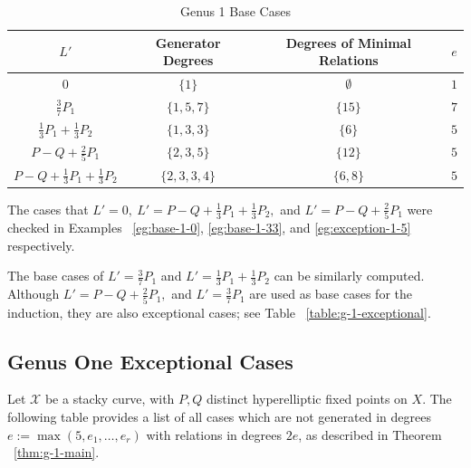 \documentclass{amsart}
\theoremstyle{plain}
\theoremstyle{definition}
\theoremstyle{remark}
\numberwithin{equation}{section}
\newcommand\ssec{\subsection}
\newcommand\sx{\mathscr X}
\newcommand{\halfcan}{L}
\begin{document}
\begin{table}	
\begin{tabular}
{| c || c | c | c |}	
	\hline
	$\halfcan'$ & Generator Degrees & Degrees of Minimal Relations & $e$ \\
	\hline
	\hline
	$0$ & $\{1\}$ & $\emptyset$ & $1$ \\	\hline

	$\frac{3}{7} P_1$ & $\{1,5,7\}$ & $\{15\}$ & $7$ \\	\hline
	
	$\frac{1}{3} P_1 + \frac{1}{3} P_2$ & $\{1, 3, 3\}$ & $\{6\}$ & $5$ \\	\hline
	
	$P - Q + \frac{2}{5} P_1$ & $\{2, 3, 5\}$ & $\{12\}$ & $5$ \\	\hline
	
	$P - Q + \frac{1}{3} P_1 + \frac{1}{3}P_2$ & $\{2, 3, 3, 4\}$ & $\{6,8\}$ & $5$ \\	\hline
\end{tabular}	

\caption{Genus 1 Base Cases}
\label{table:g-1-base}
	
\end{table}

The cases that $L' = 0, \: L' = P-Q +\frac{1}{3}P_1 + \frac{1}{3}P_2,$ and $L' = P-Q + \frac{2}{5}P_1$ were checked in Examples ~\ref{eg:base-1-0}, \ref{eg:base-1-33}, and \ref{eg:exception-1-5} respectively.

The base cases of $L' = \frac{3}{7}P_1$ and $L' = \frac{1}{3}P_1 +\frac{1}{3}P_2$ can be similarly computed. Although $L' = P - Q + \frac{2}{5}P_1,$ and $L' = \frac{3}{7}P_1$ are used as base cases for the induction, they are also exceptional cases; see Table ~\ref{table:g-1-exceptional}.

\ssec{Genus One Exceptional Cases}
\label{ssec:g-1-exceptional}
Let $\sx$ be a stacky curve, with $P, Q$ distinct hyperelliptic
fixed points on $X$. The following table provides a list of all
cases which are not generated in degrees $e := \max(5, e_1, \ldots,
e_r)$ with relations in degrees $2e$, as described in Theorem
~\ref{thm:g-1-main}.
\end{document}
